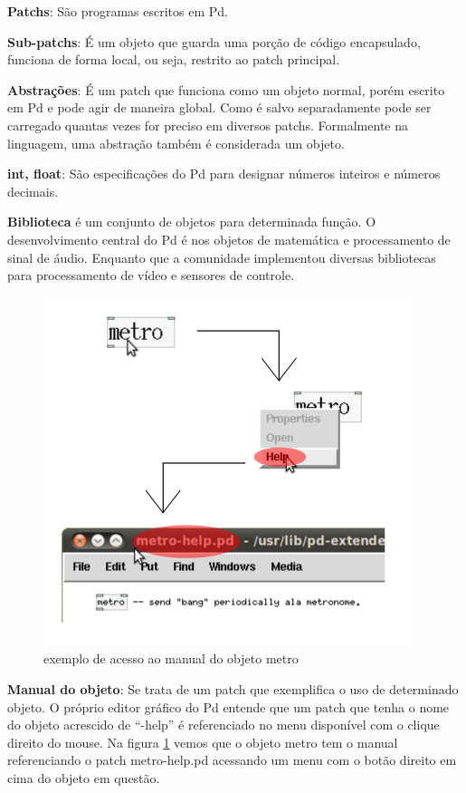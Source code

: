 \documentclass{ppgmus}
\begin{document}
\textbf{Patchs}: São programas escritos em Pd.

\textbf{Sub-patchs}: É um objeto que guarda uma porção de código encapsulado, funciona
de forma local, ou seja, restrito ao patch principal.

\textbf{Abstrações}: É um patch que funciona como um objeto normal, porém escrito em Pd e pode agir de maneira global.
Como é salvo separadamente pode ser carregado quantas vezes for preciso em diversos patchs. Formalmente na linguagem,
 uma abstração também é considerada um objeto.

\textbf{int, float}: São especificações do Pd para designar números inteiros e números decimais.

\textbf{Biblioteca} é um conjunto de objetos para determinada função. O desenvolvimento
central do Pd é nos objetos de matemática e processamento de sinal de áudio. Enquanto
que a comunidade implementou diversas bibliotecas para processamento de vídeo e sensores
de controle. 


\begin{figure}
\includegraphics[scale=.6]{help}
\caption{exemplo de acesso ao manual do objeto metro}
\label{help}
\end{figure}


\textbf{Manual do objeto}: Se trata de um patch que exemplifica o uso de determinado
objeto. O próprio editor gráfico do Pd entende que um patch que tenha o nome do objeto 
acrescido de ``-help'' é referenciado no menu disponível com o clique direito do mouse. 
Na figura \ref{help} vemos que o objeto metro tem o manual
referenciando o patch metro-help.pd acessando um 
menu com o botão direito em cima do objeto em questão.
\end{document}
